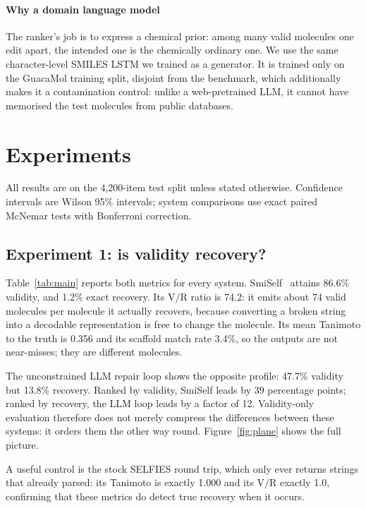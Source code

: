 \documentclass[conference]{IEEEtran}
\begin{document}
\paragraph{Why a domain language model}
The ranker's job is to express a chemical prior: among many valid molecules one
edit apart, the intended one is the chemically ordinary one. We use the same
character-level SMILES LSTM we trained as a generator. It is trained only on the
GuacaMol training split, disjoint from the benchmark, which additionally makes
it a contamination control: unlike a web-pretrained LLM, it cannot have
memorised the test molecules from public databases.

\section{Experiments}

All results are on the 4{,}200-item test split unless stated otherwise.
Confidence intervals are Wilson 95\% intervals; system comparisons use exact
paired McNemar tests with Bonferroni correction.

\subsection{Experiment 1: is validity recovery?}\label{sec:exp1}

Table~\ref{tab:main} reports both metrics for every system.
SmiSelf~\citep{smiself2025} attains 86.6\% validity, and 1.2\% exact
recovery. Its $\mathrm{V/R}$ ratio is 74.2: it emits about 74 valid molecules
per molecule it actually recovers, because converting a broken string into a
decodable representation is free to change the molecule. Its mean Tanimoto to
the truth is 0.356 and its scaffold match rate 3.4\%, so the outputs are not
near-misses; they are different molecules.

The unconstrained LLM repair loop shows the opposite profile: 47.7\% validity
but 13.8\% recovery. Ranked by validity, SmiSelf leads by 39 percentage points;
ranked by recovery, the LLM loop leads by a factor of 12. Validity-only
evaluation therefore does not merely compress the differences between these
systems: it orders them the other way round. Figure~\ref{fig:plane} shows the
full picture.

A useful control is the stock SELFIES round trip, which only ever returns
strings that already parsed: its Tanimoto is exactly 1.000 and its
$\mathrm{V/R}$ exactly 1.0, confirming that these metrics do detect true
recovery when it occurs.
\end{document}
